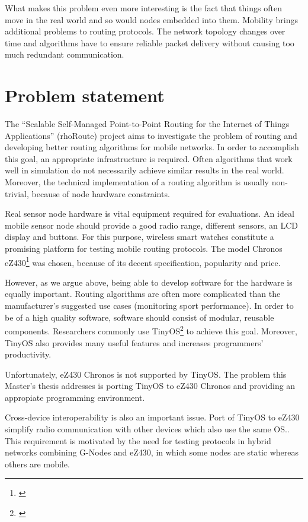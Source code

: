What makes this problem even more interesting is the fact that things often move in the real world and so would nodes embedded into them.
Mobility brings additional problems to routing protocols.
The network topology changes over time and algorithms have to ensure reliable packet delivery without causing too much redundant communication.


\section{Problem statement}
The ``Scalable Self-Managed Point-to-Point Routing for the Internet of Things Applications'' (rhoRoute) project aims to investigate the problem of routing and developing better routing algorithms for mobile networks.
In order to accomplish this goal, an appropriate infrastructure is required.
Often algorithms that work well in simulation do not necessarily achieve similar results in the real world.
Moreover, the technical implementation of a routing algorithm is usually non-trivial, because of node hardware constraints.

Real sensor node hardware is vital equipment required for evaluations.
An ideal mobile sensor node should provide a good radio range, different sensors, an LCD display and buttons.
For this purpose, wireless smart watches constitute a promising platform for testing mobile routing protocols.
The model Chronos eZ430\footnote{\cite{eZ430Chronos}} was chosen, because of its decent specification, popularity and price.

However, as we argue above, being able to develop software for the hardware is equally important.
Routing algorithms are often more complicated than the manufacturer's suggested use cases (monitoring sport performance). 
In order to be of a high quality software, software should consist of modular, reusable components.
Researchers commonly use TinyOS\footnote{\cite{TinyOS}} to achieve this goal.
Moreover, TinyOS also provides many useful features and increases programmers' productivity.

Unfortunately, eZ430 Chronos is not supported by TinyOS.
The problem this Master's thesis addresses is porting TinyOS to eZ430 Chronos and providing an appropiate programming environment. 

Cross-device interoperability is also an important issue.
Port of TinyOS to eZ430 simplify radio communication with other devices which also use the same OS..
This requirement is motivated by the need for testing protocols in hybrid networks combining G-Nodes and eZ430, in which some nodes are static whereas others are mobile.

